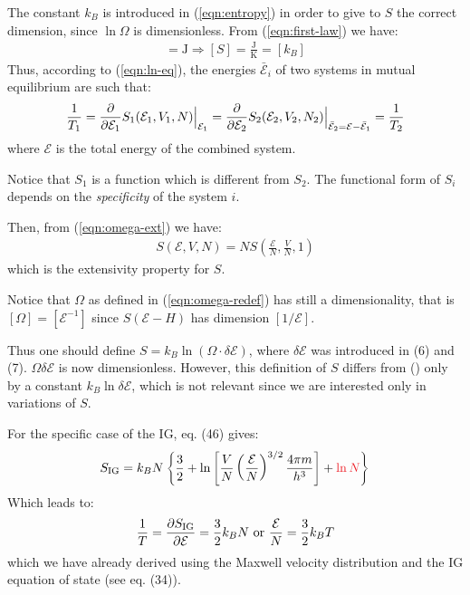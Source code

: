 \documentclass[../../main.tex]{subfiles}
\begin{document}
\medskip

The constant $k_B$ is introduced in (\ref{eqn:entropy}) in order to give to $S$ the correct dimension, since $\ln \Omega$ is dimensionless. From (\ref{eqn:first-law}) we have:
\begin{align*}
    [TS] = \si{\J} \Rightarrow [S] = \frac{\si{\J}}{\si{\K}}  = [k_B]
\end{align*}
Thus, according to (\ref{eqn:ln-eq}), the energies $\bar{\mathcal{E}}_i$ of two systems in mutual equilibrium are such that:
\begin{align*}
    \frac{1}{T_1} = \pdv{\mathcal{E}_1} S_1(\mathcal{E}_1, V_1, N) \Big|_{\mathcal{E}_1} = \pdv{\mathcal{E}_2} S_2(\mathcal{E}_2, V_2, N_2) \Big|_{\bar{\mathcal{E}}_2 = \mathcal{E}- \bar{\mathcal{E}}_1} = \frac{1}{T_2} 
\end{align*}
where $\mathcal{E}$ is the total energy of the combined system.

\medskip

Notice that $S_1$ is a function which is different from $S_2$. The functional form of $S_i$ depends on the \textit{specificity} of the system $i$.

\medskip

Then, from (\ref{eqn:omega-ext}) we have:
\begin{align*}
    S(\mathcal{E}, V, N) = N S\left(\frac{\mathcal{E}}{N}, \frac{V}{N}, 1  \right)
\end{align*}
which is the extensivity property for $S$.

\begin{appr}
    Notice that $\Omega$ as defined in (\ref{eqn:omega-redef}) has still a  dimensionality, that is $[\Omega] = [\mathcal{E}^{-1}]$ since $S(\mathcal{E}-H)$ has dimension $[1/\mathcal{E}]$. %

    Thus one should define $S = k_B \ln (\Omega \cdot \delta \mathcal{E})$, where $\delta \mathcal{E}$ was introduced in (6) and (7). $\Omega \delta \mathcal{E}$ is now dimensionless. However, this definition of $S$ differs from (\label{eqn:entropy}) only by a constant $k_B \ln \delta \mathcal{E}$, which is not relevant since we are interested only in variations of $S$.
\end{appr}

For the specific case of the IG, eq. (46) gives:
\begin{align*}
    S_{\mathrm{IG}} = k_B N \left\{\frac{3}{2} + \ln\left[\frac{V}{N} \left(\frac{\mathcal{E}}{N} \right)^{3/2} \frac{4 \pi m}{h^3}  \right] + \textcolor{Red}{\ln N}  \right\}
\end{align*}
Which leads to:
\begin{align*}
    \frac{1}{T} = \pdv{S_{\mathrm{IG}}}{\mathcal{E}} = \frac{3}{2} k_B N \text{ or } \frac{\mathcal{E}}{N} = \frac{3}{2} k_B T    
\end{align*}
which we have already derived using the Maxwell velocity distribution and the IG equation of state (see eq. (34)).
\end{document}
